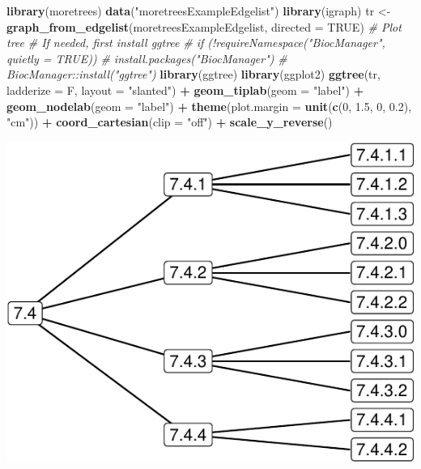 \documentclass[]{article}
\newenvironment{Shaded}{\begin{snugshade}}{\end{snugshade}}
\newcommand{\CommentTok}[1]{\textcolor[rgb]{0.56,0.35,0.01}{\textit{#1}}}
\newcommand{\DataTypeTok}[1]{\textcolor[rgb]{0.13,0.29,0.53}{#1}}
\newcommand{\DecValTok}[1]{\textcolor[rgb]{0.00,0.00,0.81}{#1}}
\newcommand{\FloatTok}[1]{\textcolor[rgb]{0.00,0.00,0.81}{#1}}
\newcommand{\KeywordTok}[1]{\textcolor[rgb]{0.13,0.29,0.53}{\textbf{#1}}}
\newcommand{\NormalTok}[1]{#1}
\newcommand{\OperatorTok}[1]{\textcolor[rgb]{0.81,0.36,0.00}{\textbf{#1}}}
\newcommand{\OtherTok}[1]{\textcolor[rgb]{0.56,0.35,0.01}{#1}}
\newcommand{\StringTok}[1]{\textcolor[rgb]{0.31,0.60,0.02}{#1}}
\begin{document}
\begin{Shaded}
\begin{Highlighting}[]
\KeywordTok{library}\NormalTok{(moretrees)}
\KeywordTok{data}\NormalTok{(}\StringTok{"moretreesExampleEdgelist"}\NormalTok{)}
\KeywordTok{library}\NormalTok{(igraph)}
\NormalTok{tr <-}\StringTok{ }\KeywordTok{graph_from_edgelist}\NormalTok{(moretreesExampleEdgelist, }\DataTypeTok{directed =} \OtherTok{TRUE}\NormalTok{)}
\CommentTok{# Plot tree}
\CommentTok{# If needed, first install ggtree}
\CommentTok{# if (!requireNamespace("BiocManager", quietly = TRUE))}
\CommentTok{# install.packages("BiocManager")}
\CommentTok{# BiocManager::install("ggtree")}
\KeywordTok{library}\NormalTok{(ggtree)}
\KeywordTok{library}\NormalTok{(ggplot2)}
\KeywordTok{ggtree}\NormalTok{(tr, }\DataTypeTok{ladderize =}\NormalTok{ F, }\DataTypeTok{layout =} \StringTok{"slanted"}\NormalTok{) }\OperatorTok{+}\StringTok{ }
\StringTok{  }\KeywordTok{geom_tiplab}\NormalTok{(}\DataTypeTok{geom =} \StringTok{"label"}\NormalTok{) }\OperatorTok{+}\StringTok{ }
\StringTok{  }\KeywordTok{geom_nodelab}\NormalTok{(}\DataTypeTok{geom =} \StringTok{"label"}\NormalTok{) }\OperatorTok{+}
\StringTok{  }\KeywordTok{theme}\NormalTok{(}\DataTypeTok{plot.margin =} \KeywordTok{unit}\NormalTok{(}\KeywordTok{c}\NormalTok{(}\DecValTok{0}\NormalTok{, }\FloatTok{1.5}\NormalTok{, }\DecValTok{0}\NormalTok{, }\FloatTok{0.2}\NormalTok{), }\StringTok{"cm"}\NormalTok{)) }\OperatorTok{+}
\StringTok{  }\KeywordTok{coord_cartesian}\NormalTok{(}\DataTypeTok{clip =} \StringTok{"off"}\NormalTok{) }\OperatorTok{+}\StringTok{ }
\StringTok{  }\KeywordTok{scale_y_reverse}\NormalTok{()}
\end{Highlighting}
\end{Shaded}

\begin{center}\includegraphics{moretrees_files/figure-latex/tree-1} \end{center}
\end{document}
